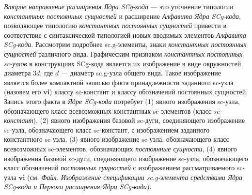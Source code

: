 \textit{Второе направление расширения Ядра SCg-кода} --- это уточнение типологии \textit{константных постоянных сущностей} и расширение \textit{Алфавита Ядра SCg-кода\scnsupergroupsign}, позволяющее типологию \textit{константных постоянных сущностей} привести в соответствие с синтаксической типологией новых вводимых элементов \textit{Алфавита SCg-кода\scnsupergroupsign}. Рассмотрим подробнее sc.g-элементы, знаки \textit{константных постоянных сущностей} различного вида. Графическим признаком \textit{константных постоянных sc-узлов} в конструкциях SCg-кода является их изображение в виде \uline{окружностей} диаметра $3d$, где $d$ --- диаметр sc.g-узла общего вида. Такое изображение является более компактной записью факта принадлежности заданного sc-узла (назовем его $\bm{vi}$) классу sc-констант и классу обозначений постоянных сущностей. Запись этого факта в \textit{Ядре SCg-кода} потребует (1) явного изображения sc-узла, обозначающего класс всевозможных константных sc-элементов (класс \textit{sc-констант}), (2) явного изображения базовой sc-дуги, соединяющего изображение sc-узла, обозначающего класс sc-констант, с изображением заданного константного sc-узла, (3) явного изображение sc-узла, обозначающего класс всевозможных sc-элементов, обозначающих \textit{постоянные сущности}, (4) явного изображения базовой sc-дуги, соединяющего изображение sc-узла, обозначающего класс обозначений \textit{постоянных сущностей} с изображением рассматриваемого sc-узла $\bm{vi}$ (см. \textit{Файл. Изображение спецификации sc.g-элемента средствами Ядра SCg-кода и Первого расширения Ядра SCg-кода}).

